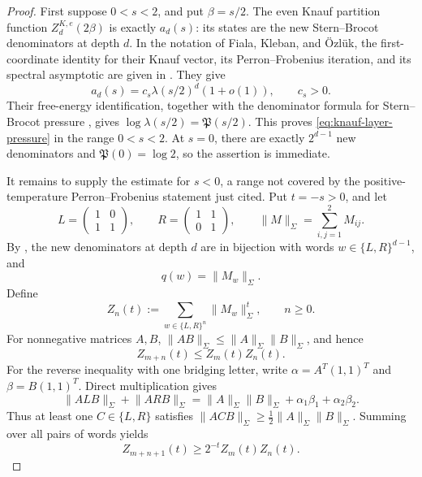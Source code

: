 \begin{proof}
First suppose \(0<s<2\), and put \(\beta=s/2\).  The even Knauf
partition function \(Z^{K,e}_d(2\beta)\) is exactly \(a_d(s)\): its
states are the new Stern--Brocot denominators at depth \(d\).  In the
notation of Fiala, Kleban, and \"Ozl\"uk, the first-coordinate identity
for their Knauf vector, its Perron--Frobenius iteration, and its spectral
asymptotic are given in
\cite[Sec.~IV, especially Eqs.~(23), (26), and (28)]{FialaKlebanOzluk2003}.
They give
\[
 a_d(s)=c_s\lambda(s/2)^d(1+o(1)),\qquad c_s>0.
\]
Their free-energy identification, together with the denominator formula
for Stern--Brocot pressure
\cite[Thm.~1.1 and the denominator formula in Sec.~2]{KessebohmerStratmann2007},
gives \(\log\lambda(s/2)=\mathfrak P(s/2)\).  This proves
\eqref{eq:knauf-layer-pressure} in the range \(0<s<2\).  At \(s=0\),
there are exactly \(2^{d-1}\) new denominators and
\(\mathfrak P(0)=\log2\), so the assertion is immediate.

It remains to supply the estimate for \(s<0\), a range not covered by
the positive-temperature Perron--Frobenius statement just cited.  Put
\(t=-s>0\), and let
\[
 L=\begin{pmatrix}1&0\\1&1\end{pmatrix},\qquad
 R=\begin{pmatrix}1&1\\0&1\end{pmatrix},\qquad
 \lVert M\rVert_\Sigma=\sum_{i,j=1}^2M_{ij}.
\]
 By , the new denominators at
 depth \(d\) are in bijection with words \(w\in\{L,R\}^{d-1}\), and
\begin{equation}
 q(w)=\lVert M_w\rVert_\Sigma.
 \label{eq:stern-brocot-matrix-denominator}
\end{equation}
Define
\[
 Z_n(t):=\sum_{w\in\{L,R\}^n}\lVert M_w\rVert_\Sigma^t,
 \qquad n\ge0.
\]
For nonnegative matrices \(A,B\),
\(\lVert AB\rVert_\Sigma\le
\lVert A\rVert_\Sigma\lVert B\rVert_\Sigma\), and hence
\begin{equation}
 Z_{m+n}(t)\le Z_m(t)Z_n(t).
 \label{eq:matrix-partition-submultiplicative}
\end{equation}
For the reverse inequality with one bridging letter, write
\(\alpha=A^T(1,1)^T\) and \(\beta=B(1,1)^T\).  Direct multiplication gives
\[
 \lVert ALB\rVert_\Sigma+\lVert ARB\rVert_\Sigma
 =\lVert A\rVert_\Sigma\lVert B\rVert_\Sigma
   +\alpha_1\beta_1+\alpha_2\beta_2.
\]
Thus at least one \(C\in\{L,R\}\) satisfies
\(\lVert ACB\rVert_\Sigma\ge
\frac12\lVert A\rVert_\Sigma\lVert B\rVert_\Sigma\).  Summing over
all pairs of words yields
\begin{equation}
 Z_{m+n+1}(t)\ge2^{-t}Z_m(t)Z_n(t).
 \label{eq:matrix-partition-bridged}
\end{equation}


\end{proof}
